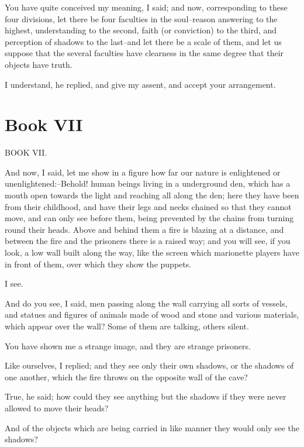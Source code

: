 You have quite conceived my meaning, I said; and now, corresponding to
these four divisions, let there be four faculties in the soul--reason
answering to the highest, understanding to the second, faith (or
conviction) to the third, and perception of shadows to the last--and let
there be a scale of them, and let us suppose that the several faculties
have clearness in the same degree that their objects have truth.

I understand, he replied, and give my assent, and accept your
arrangement.


\section{Book VII} %
\label{sec:book_vii}



BOOK VII.

And now, I said, let me show in a figure how far our nature is
enlightened or unenlightened:--Behold! human beings living in a
underground den, which has a mouth open towards the light and reaching
all along the den; here they have been from their childhood, and have
their legs and necks chained so that they cannot move, and can only
see before them, being prevented by the chains from turning round
their heads. Above and behind them a fire is blazing at a distance, and
between the fire and the prisoners there is a raised way; and you will
see, if you look, a low wall built along the way, like the screen which
marionette players have in front of them, over which they show the
puppets.

I see.

And do you see, I said, men passing along the wall carrying all sorts of
vessels, and statues and figures of animals made of wood and stone and
various materials, which appear over the wall? Some of them are talking,
others silent.

You have shown me a strange image, and they are strange prisoners.

Like ourselves, I replied; and they see only their own shadows, or the
shadows of one another, which the fire throws on the opposite wall of
the cave?

True, he said; how could they see anything but the shadows if they were
never allowed to move their heads?

And of the objects which are being carried in like manner they would
only see the shadows?

